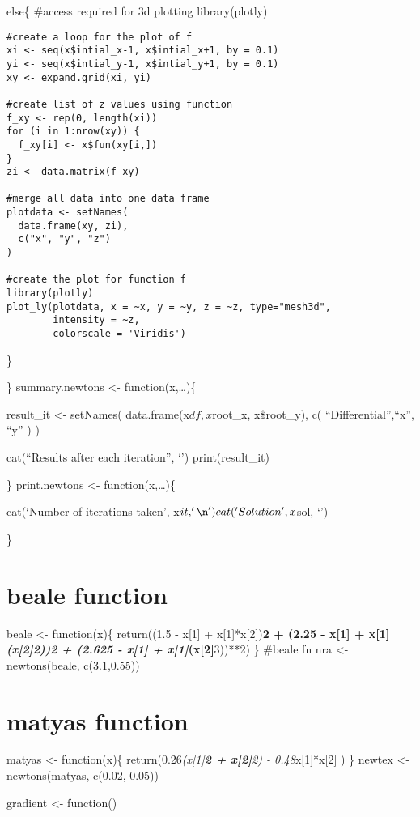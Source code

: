 \documentclass[]{article}
\begin{document}
{{else\{ \#access required for 3d plotting library(plotly)

\begin{verbatim}
#create a loop for the plot of f
xi <- seq(x$intial_x-1, x$intial_x+1, by = 0.1)
yi <- seq(x$intial_y-1, x$intial_y+1, by = 0.1)
xy <- expand.grid(xi, yi)

#create list of z values using function
f_xy <- rep(0, length(xi))
for (i in 1:nrow(xy)) {
  f_xy[i] <- x$fun(xy[i,])
}
zi <- data.matrix(f_xy)

#merge all data into one data frame
plotdata <- setNames(
  data.frame(xy, zi),
  c("x", "y", "z")
)

#create the plot for function f
library(plotly)
plot_ly(plotdata, x = ~x, y = ~y, z = ~z, type="mesh3d",
        intensity = ~z,
        colorscale = 'Viridis')
\end{verbatim}

\}

\} summary.newtons \textless{}- function(x,\ldots{})\{

result\_it \textless{}- setNames( data.frame(x\(df, x\)root\_x,
x\$root\_y), c( ``Differential'',``x'', ``y'' ) )

cat(``Results after each iteration'', `\n') print(result\_it)

\} print.newtons \textless{}- function(x,\ldots{})\{

cat(`Number of iterations taken', x\(it, '\n')  cat('Solution', x\)sol,
`\n')

\}

\section{beale function}\label{beale-function}

beale \textless{}- function(x)\{ return((1.5 - x{[}1{]} +
x{[}1{]}*x{[}2{]})\textbf{2 + (2.25 - x{[}1{]} +
x{[}1{]}\emph{(x{[}2{]}\textbf{2))}2 + (2.625 - x{[}1{]} +
x{[}1{]}}(x{[}2{]}}3))**2) \} \#beale fn nra \textless{}- newtons(beale,
c(3.1,0.55))

\section{matyas function}\label{matyas-function}

matyas \textless{}- function(x)\{ return(0.26\emph{(x{[}1{]}\textbf{2 +
x{[}2{]}}2) - 0.48}x{[}1{]}*x{[}2{]} ) \} newtex \textless{}-
newtons(matyas, c(0.02, 0.05))

gradient \textless{}- function()

}}
\end{document}
